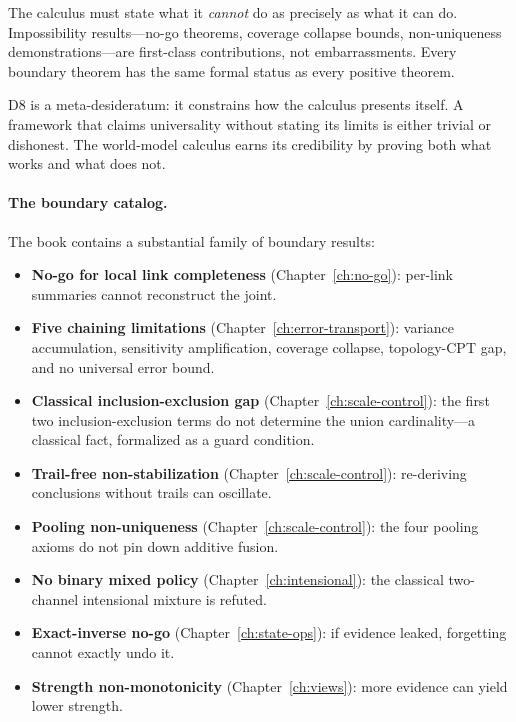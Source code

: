\documentclass[11pt,openany]{report}
\begin{document}
\begin{definition}
\label{def:d8}
The calculus must state what it \emph{cannot} do as precisely as what
it can do.  Impossibility results---no-go theorems, coverage collapse
bounds, non-uniqueness demonstrations---are first-class contributions,
not embarrassments.  Every boundary theorem has the same formal status
as every positive theorem.
\end{definition}

\noindent
D8 is a meta-desideratum: it constrains how the calculus presents
itself.  A framework that claims universality without stating its
limits is either trivial or dishonest.  The world-model calculus earns
its credibility by proving both what works and what does not.

\paragraph{The boundary catalog.}
The book contains a substantial family of boundary results:
\begin{itemize}
\item \textbf{No-go for local link completeness}
  (Chapter~\ref{ch:no-go}): per-link summaries cannot reconstruct
  the joint.
\item \textbf{Five chaining limitations}
  (Chapter~\ref{ch:error-transport}): variance accumulation,
  sensitivity amplification, coverage collapse, topology-CPT gap,
  and no universal error bound.
\item \textbf{Classical inclusion-exclusion gap}
  (Chapter~\ref{ch:scale-control}): the first two
  inclusion-exclusion terms do not determine the union
  cardinality---a classical fact, formalized as a guard condition.
\item \textbf{Trail-free non-stabilization}
  (Chapter~\ref{ch:scale-control}): re-deriving conclusions without
  trails can oscillate.
\item \textbf{Pooling non-uniqueness}
  (Chapter~\ref{ch:scale-control}): the four pooling axioms do not
  pin down additive fusion.
\item \textbf{No binary mixed policy}
  (Chapter~\ref{ch:intensional}): the classical two-channel
  intensional mixture is refuted.
\item \textbf{Exact-inverse no-go}
  (Chapter~\ref{ch:state-ops}): if evidence leaked, forgetting
  cannot exactly undo it.
\item \textbf{Strength non-monotonicity}
  (Chapter~\ref{ch:views}): more evidence can yield lower strength.
\end{itemize}
\end{document}
